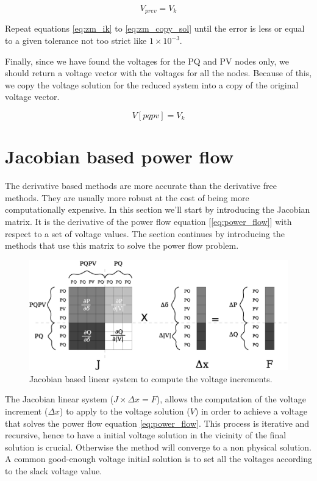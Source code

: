 \documentclass[a4paper,twoside,fleqn]{tufte-book}
\begin{document}
\begin{equation}
V_{prev} = V_k
\label{eq:zm_copy_sol}
\end{equation}

Repeat equations \ref{eq:zm_ik} to \ref{eq:zm_copy_sol} until the error is less or equal to a given tolerance not too strict like $1\times10^{-3}$.

Finally, since we have found the voltages for the PQ and PV nodes only, we should return a voltage vector with the voltages for all the nodes. Because of this, we copy the voltage solution for the reduced system into a copy of the original voltage vector.

\begin{equation}
V[pqpv] = V_k
\end{equation}


\section{Jacobian based power flow}

The derivative based methods are more accurate than the derivative free methods. They are usually more robust at the cost of being more computationally expensive. In this section we'll start by introducing the Jacobian matrix. It is the derivative of the power flow equation  [\ref{eq:power_flow}] with respect to a set of voltage values. The section continues by introducing the methods that use this matrix to solve the power flow problem.

\begin{center}
\begin{figure}[h!]
  \includegraphics[width=0.9\linewidth]{img/JacobianBased.eps}
  \caption{Jacobian based linear system to compute the voltage increments.}
  \label{fig:jacobian_based}
\end{figure}
\end{center}

The Jacobian linear system ($J \times \Delta x = F$), allows the computation of the voltage increment ($\Delta x$) to apply to the voltage solution ($V$) in order to achieve a voltage that solves the power flow equation \ref{eq:power_flow}. This process is iterative and recursive, hence to have a initial voltage solution in the vicinity of the final solution is crucial. Otherwise the method will converge to a non physical solution. A common good-enough voltage initial solution is to set all the voltages according to the slack voltage value.
\end{document}
